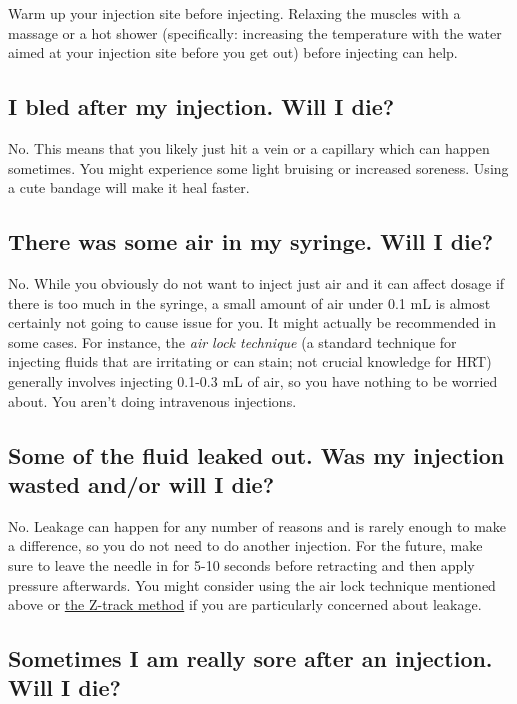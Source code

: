 \documentclass{article}
\begin{document}
Warm up your injection site before injecting. Relaxing the muscles with a massage or a hot shower (specifically: increasing the temperature with the water aimed at your injection site before you get out) before injecting can help.

\subsection{I bled after my injection. Will I die?}

No. This means that you likely just hit a vein or a capillary which can happen sometimes. You might experience some light bruising or increased soreness. Using a cute bandage will make it heal faster.

\subsection{There was some air in my syringe. Will I die?}\label{7-7}

No. While you obviously do not want to inject just air and it can affect dosage if there is too much in the syringe, a small amount of air under 0.1 mL is almost certainly not going to cause issue for you. It might actually be recommended in some cases. For instance, the \textit{air lock technique} (a standard technique for injecting fluids that are irritating or can stain; not crucial knowledge for HRT) generally involves injecting 0.1-0.3 mL of air, so you have nothing to be worried about. You aren’t doing intravenous injections.

\subsection{Some of the fluid leaked out. Was my injection wasted and/or will I die?}

No. Leakage can happen for any number of reasons and is rarely enough to make a difference, so you do not need to do another injection. For the future, make sure to leave the needle in for 5-10 seconds before retracting and then apply pressure afterwards. You might consider using the air lock technique mentioned above or \href{https://www.nurse.com/nursing-resources/definitions/what-is-z-track-method/}{the Z-track method} if you are particularly concerned about leakage.

\subsection{Sometimes I am really sore after an injection. Will I die?}
\end{document}
